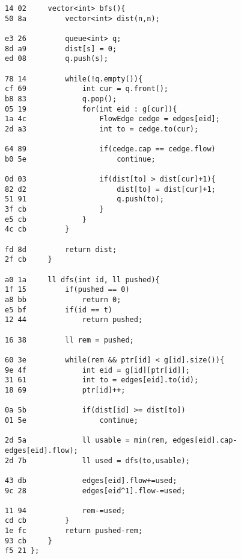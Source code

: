 \documentclass[11pt, a4paper, twoside]{article}
\begin{document}
\begin{lstlisting}
14 02     vector<int> bfs(){
50 8a         vector<int> dist(n,n);
      
e3 26         queue<int> q;
8d a9         dist[s] = 0;
ed 08         q.push(s);
      
78 14         while(!q.empty()){
cf 69             int cur = q.front();
b8 83             q.pop();
05 19             for(int eid : g[cur]){
1a 4c                 FlowEdge cedge = edges[eid];
2d a3                 int to = cedge.to(cur);
      
64 89                 if(cedge.cap == cedge.flow)
b0 5e                     continue;
                      
0d 03                 if(dist[to] > dist[cur]+1){
82 d2                     dist[to] = dist[cur]+1;
51 91                     q.push(to);
3f cb                 }
e5 cb             }
4c cb         }
      
fd 8d         return dist;
2f cb     }
      
a0 1a     ll dfs(int id, ll pushed){
1f 15         if(pushed == 0)
a8 bb             return 0;
e5 bf         if(id == t)
12 44             return pushed;
      
16 38         ll rem = pushed;
      
60 3e         while(rem && ptr[id] < g[id].size()){
9e 4f             int eid = g[id][ptr[id]];
31 61             int to = edges[eid].to(id);
18 69             ptr[id]++;
      
0a 5b             if(dist[id] >= dist[to])
01 5e                 continue;
      
2d 5a             ll usable = min(rem, edges[eid].cap-edges[eid].flow);
2d 7b             ll used = dfs(to,usable);
      
43 db             edges[eid].flow+=used;
9c 28             edges[eid^1].flow-=used;
      
11 94             rem-=used;
cd cb         }
1e fc         return pushed-rem;
93 cb     }
f5 21 };
\end{lstlisting}
\end{document}
